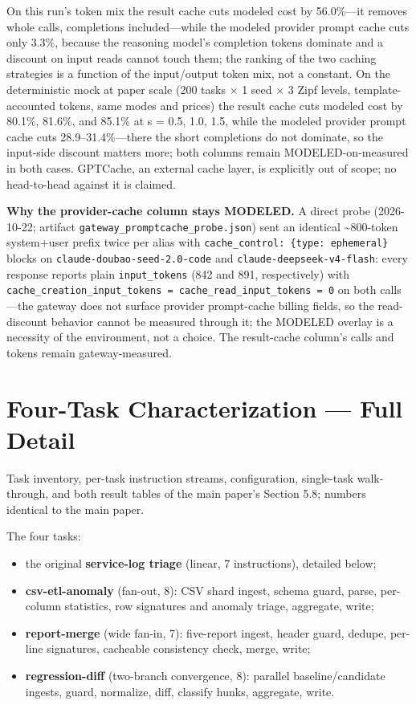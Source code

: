 \documentclass[
  11pt,
]{article}
\providecommand{\tightlist}{%
  \setlength{\itemsep}{0pt}\setlength{\parskip}{0pt}}
\begin{document}
On this run's token mix the result cache cuts modeled cost by
56.0\%---it removes whole calls, completions included---while the
modeled provider prompt cache cuts only 3.3\%, because the reasoning
model's completion tokens dominate and a discount on input reads cannot
touch them; the ranking of the two caching strategies is a function of
the input/output token mix, not a constant. On the deterministic mock at
paper scale (200 tasks \(\times\) 1 seed \(\times\) 3 Zipf levels,
template-accounted tokens, same modes and prices) the result cache cuts
modeled cost by 80.1\%, 81.6\%, and 85.1\% at s = 0.5, 1.0, 1.5, while
the modeled provider prompt cache cuts 28.9--31.4\%---there the short
completions do not dominate, so the input-side discount matters more;
both columns remain MODELED-on-measured in both cases. GPTCache, an
external cache layer, is explicitly out of scope; no head-to-head
against it is claimed.

\textbf{Why the provider-cache column stays MODELED.} A direct probe
(2026-10-22; artifact \texttt{gateway\_promptcache\_probe.json}) sent an
identical \textasciitilde800-token system+user prefix twice per alias
with \texttt{cache\_control:\ \{type:\ ephemeral\}} blocks on
\texttt{claude-doubao-seed-2.0-code} and
\texttt{claude-deepseek-v4-flash}: every response reports plain
\texttt{input\_tokens} (842 and 891, respectively) with
\texttt{cache\_creation\_input\_tokens\ =\ cache\_read\_input\_tokens\ =\ 0}
on both calls---the gateway does not surface provider prompt-cache
billing fields, so the read-discount behavior cannot be measured through
it; the MODELED overlay is a necessity of the environment, not a choice.
The result-cache column's calls and tokens remain gateway-measured.

\section{Four-Task Characterization --- Full
Detail}\label{four-task-characterization-full-detail}

Task inventory, per-task instruction streams, configuration, single-task
walk-through, and both result tables of the main paper's Section 5.8;
numbers identical to the main paper.

The four tasks:

\begin{itemize}
\tightlist
\item
  the original \textbf{service-log triage} (linear, 7 instructions),
  detailed below;
\item
  \textbf{csv-etl-anomaly} (fan-out, 8): CSV shard ingest, schema guard,
  parse, per-column statistics, row signatures and anomaly triage,
  aggregate, write;
\item
  \textbf{report-merge} (wide fan-in, 7): five-report ingest, header
  guard, dedupe, per-line signatures, cacheable consistency check,
  merge, write;
\item
  \textbf{regression-diff} (two-branch convergence, 8): parallel
  baseline/candidate ingests, guard, normalize, diff, classify hunks,
  aggregate, write.
\end{itemize}
\end{document}
